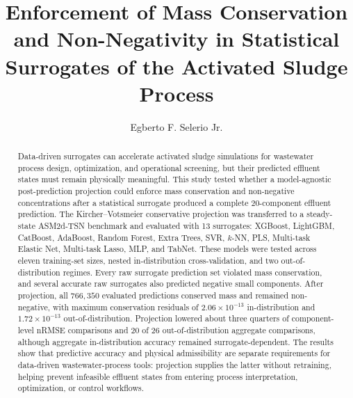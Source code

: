 \documentclass[a4paper,fleqn]{cas-sc}
\begin{document}
\let\WriteBookmarks\relax
\def\floatpagepagefraction{1}
\def\textpagefraction{.001}


\title[mode=title]{Enforcement of Mass Conservation and Non-Negativity in Statistical Surrogates of the Activated Sludge Process}

\author[1]{Egberto F. Selerio Jr.}
\cormark[1]



\begin{abstract}
Data-driven surrogates can accelerate activated sludge simulations for wastewater process design, optimization, and operational screening, but their predicted effluent states must remain physically meaningful. This study tested whether a model-agnostic post-prediction projection could enforce mass conservation and non-negative concentrations after a statistical surrogate produced a complete 20-component effluent prediction. The Kircher--Votsmeier conservative projection was transferred to a steady-state ASM2d-TSN benchmark and evaluated with 13 surrogates: XGBoost, LightGBM, CatBoost, AdaBoost, Random Forest, Extra Trees, SVR, $k$-NN, PLS, Multi-task Elastic Net, Multi-task Lasso, MLP, and TabNet. These models were tested across eleven training-set sizes, nested in-distribution cross-validation, and two out-of-distribution regimes. Every raw surrogate prediction set violated mass conservation, and several accurate raw surrogates also predicted negative small components. After projection, all $766{,}350$ evaluated predictions conserved mass and remained non-negative, with maximum conservation residuals of $2.06\times10^{-13}$ in-distribution and $1.72\times10^{-13}$ out-of-distribution. Projection lowered about three quarters of component-level nRMSE comparisons and 20 of 26 out-of-distribution aggregate comparisons, although aggregate in-distribution accuracy remained surrogate-dependent. The results show that predictive accuracy and physical admissibility are separate requirements for data-driven wastewater-process tools: projection supplies the latter without retraining, helping prevent infeasible effluent states from entering process interpretation, optimization, or control workflows.
\end{abstract}
\end{document}
